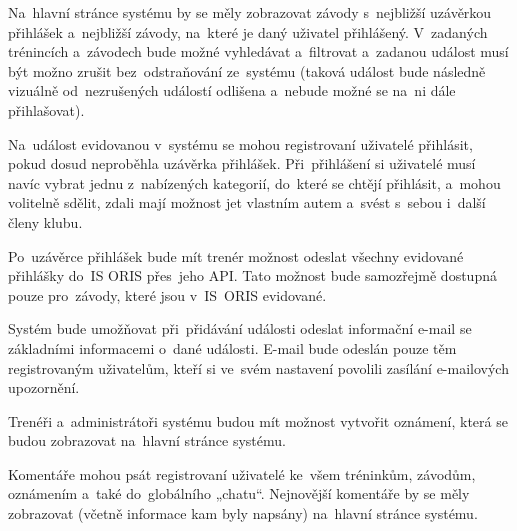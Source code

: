 \begin{enumerate}[label=\textcolor{decoration}{\textbf{F\arabic*}}]
	Na~hlavní stránce systému by se měly zobrazovat závody s~nejbližší uzávěrkou přihlášek a~nejbližší závody, na~které je daný uživatel přihlášený. V~zadaných trénincích a~závodech bude možné vyhledávat a~filtrovat a~zadanou událost musí být možno zrušit bez~odstraňování ze~systému (taková událost bude následně vizuálně od~nezrušených událostí odlišena a~nebude možné se na~ni dále přihlašovat).

	Na~událost evidovanou v~systému se mohou registrovaní uživatelé přihlásit, pokud dosud neproběhla uzávěrka přihlášek. Při~přihlášení si uživatelé musí navíc vybrat jednu z~nabízených kategorií, do~které se chtějí přihlásit, a~mohou volitelně sdělit, zdali mají možnost jet vlastním autem a~svést s~sebou i~další členy klubu.

	Po~uzávěrce přihlášek bude mít trenér možnost odeslat všechny evidované přihlášky do~IS ORIS přes~jeho API. Tato možnost bude samozřejmě dostupná pouze pro~závody, které jsou v~IS~ORIS evidované.

	Systém bude umožňovat při~přidávání události odeslat informační e-mail se základními informacemi o~dané události. E-mail bude odeslán pouze těm registrovaným uživatelům, kteří si ve~svém nastavení povolili zasílání e-mailových upozornění.

	Trenéři a~administrátoři systému budou mít možnost vytvořit oznámení, která se budou zobrazovat na~hlavní stránce systému.

	Komentáře mohou psát registrovaní uživatelé ke~všem tréninkům, závodům, oznámením a~také do~globálního „chatu“. Nejnovější komentáře by se měly zobrazovat (včetně informace kam byly napsány) na~hlavní stránce systému.
\end{enumerate}

